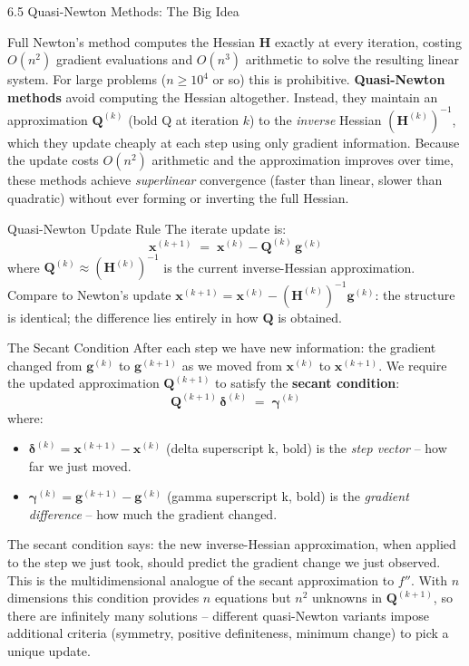 \documentclass[aspectratio=169,10pt]{beamer}
\newcommand{\xbf}{\mathbf{x}}
\newcommand{\gbf}{\mathbf{g}}
\newcommand{\Hbf}{\mathbf{H}}
\newcommand{\deltabf}{\boldsymbol{\delta}}
\newcommand{\gammabf}{\boldsymbol{\gamma}}
\begin{document}
\begin{frame}[allowframebreaks]{6.5 Quasi-Newton Methods: The Big Idea}

  Full Newton's method computes the Hessian $\Hbf$ exactly at every iteration,
  costing $O(n^2)$ gradient evaluations and $O(n^3)$ arithmetic to solve the
  resulting linear system.  For large problems ($n \geq 10^4$ or so) this is
  prohibitive.  \textbf{Quasi-Newton methods} avoid computing the Hessian
  altogether.  Instead, they maintain an approximation $\mathbf{Q}^{(k)}$ (bold Q
  at iteration $k$) to the \emph{inverse} Hessian $(\Hbf^{(k)})^{-1}$, which
  they update cheaply at each step using only gradient information.  Because the
  update costs $O(n^2)$ arithmetic and the approximation improves over time, these
  methods achieve \emph{superlinear} convergence (faster than linear, slower than
  quadratic) without ever forming or inverting the full Hessian.

  \begin{block}{Quasi-Newton Update Rule}
    The iterate update is:
    \[
      \xbf^{(k+1)} \;=\; \xbf^{(k)} - \mathbf{Q}^{(k)}\,\gbf^{(k)}
    \]
    where $\mathbf{Q}^{(k)} \approx (\Hbf^{(k)})^{-1}$ is the current
    inverse-Hessian approximation.  Compare to Newton's update $\xbf^{(k+1)} =
    \xbf^{(k)} - (\Hbf^{(k)})^{-1}\gbf^{(k)}$: the structure is identical; the
    difference lies entirely in how $\mathbf{Q}$ is obtained.
  \end{block}

  \begin{block}{The Secant Condition}
    After each step we have new information: the gradient changed from $\gbf^{(k)}$
    to $\gbf^{(k+1)}$ as we moved from $\xbf^{(k)}$ to $\xbf^{(k+1)}$.  We
    require the updated approximation $\mathbf{Q}^{(k+1)}$ to satisfy the
    \textbf{secant condition}:
    \[
      \mathbf{Q}^{(k+1)}\,\deltabf^{(k)} \;=\; \gammabf^{(k)}
    \]
    where:
    \begin{itemize}
      \item $\deltabf^{(k)} = \xbf^{(k+1)} - \xbf^{(k)}$ (delta superscript k,
        bold) is the \emph{step vector} -- how far we just moved.
      \item $\gammabf^{(k)} = \gbf^{(k+1)} - \gbf^{(k)}$ (gamma superscript k,
        bold) is the \emph{gradient difference} -- how much the gradient changed.
    \end{itemize}
    The secant condition says: the new inverse-Hessian approximation, when applied
    to the step we just took, should predict the gradient change we just observed.
    This is the multidimensional analogue of the secant approximation to $f''$.
    With $n$ dimensions this condition provides $n$ equations but $n^2$ unknowns
    in $\mathbf{Q}^{(k+1)}$, so there are infinitely many solutions -- different
    quasi-Newton variants impose additional criteria (symmetry, positive
    definiteness, minimum change) to pick a unique update.
  \end{block}


\end{frame}
\end{document}
